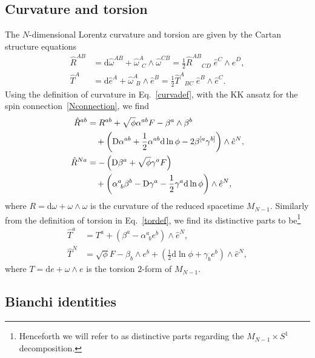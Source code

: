 \documentclass[aps,prd,12pt,superscriptaddress,showpacs,showkeys,longbibliography,reprint,nofootinbib]{revtex4-1}
\begin{document}
\subsection{Curvature and torsion}

The $N$-dimensional Lorentz curvature and torsion are given by the Cartan structure equations
\begin{align}
  \label{curvadef}
  \hat{R}^{AB} &= \mbox{d}\hat{\omega}^{AB}+\hat{\omega}^A_{\ \ C}\wedge\hat{\omega}^{CB} = \frac{1}{2} \hat{R}^{AB}{}_{CD} \; \hat{e}^C \wedge \hat{e}^D,\\
  \label{tordef}
  \hat{T}^A &= \mbox{d}\hat{e}^A+\hat{\omega}^A_{\ \ B}\wedge\hat{e}^B = \frac{1}{2} \hat{T}^{A}{}_{BC} \; \hat{e}^B \wedge \hat{e}^C. 
\end{align}
Using the definition of curvature in Eq.~\eqref{curvadef},  with the KK ansatz for the spin connection~\eqref{Nconnection}, we find
\begin{align}
  \label{R1}
  \hat{R}^{ab}&=R^{ab}+\sqrt{\phi}\alpha^{ab}F-\beta^a\wedge\beta^b\notag\\
  & \quad +\left(\mbox{D}\alpha^{ab}+\frac{1}{2}\alpha^{ab}\mbox{d}\ln\phi-2\beta^{[a}\gamma^{b]}\right)\wedge\hat{e}^N,\\
  \label{R2}
  \hat{R}^{Na}&=-\left(\mbox{D}\beta^a+\sqrt{\phi}\gamma^a F\right)\notag\\
  & \quad +\left(\alpha^a_{\ b}\beta^b-\mbox{D}\gamma^a-\frac{1}{2}\gamma^a\mbox{d}\ln\phi\right)\wedge\hat{e}^N,
\end{align}
where $R=\text{d}\omega+\omega\wedge\omega$ is the curvature of the reduced spacetime $M_{N-1}$. Similarly from the definition of torsion in Eq.~\eqref{tordef}, we find its distinctive parts to be\footnote{Henceforth we will refer to as distinctive parts regarding the $M_{N-1}\times S^1$ decomposition.}
\begin{align}\label{T1}
  \hat{T}^a &= T^a+\left(\beta^a-\alpha^a_{\ \ b}e^b\right)\wedge\hat{e}^N,\\
  \label{T2}
  \hat{T}^N &= \sqrt{\phi}F-\beta_b\wedge e^b+\left(\frac{1}{2}\mbox{d}\ln\phi+\gamma_be^b\right)\wedge\hat{e}^N,
\end{align}
where $T=\text{d}e+\omega\wedge e$ is the torsion $2$-form of $M_{N-1}$.

\subsection{Bianchi identities\label{sec:bianchi}}
\end{document}
